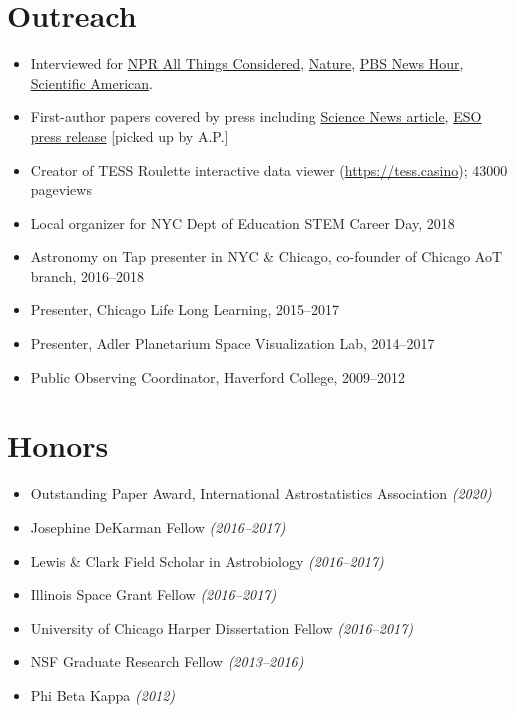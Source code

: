 \documentclass{clean_cv}
\begin{document}
\section{Outreach}
\begin{itemize}
    \item Interviewed for \href{https://www.npr.org/2018/10/03/653666274/scientists-find-what-could-be-a-history-making-moon}{NPR All Things Considered}, \href{https://www.nature.com/articles/d41586-018-04979-4}{Nature}, \href{https://www.pbs.org/newshour/science/these-stunning-maps-of-the-milky-way-pinpoint-more-than-1-billion-stars}{PBS News Hour}, \href{https://blogs.scientificamerican.com/observations/the-milky-way-revealed-as-never-before/}{Scientific American}.
    \item First-author papers covered by press including \href{https://www.sciencenews.org/article/sun-peculiar-makeup-compared-solar-twins}{Science News article}, \href{http://www.eso.org/public/usa/news/eso1529/}{ESO press release} [picked up by A.P.]
    \item Creator of TESS Roulette interactive data viewer (\href{https://tess.casino}{https://tess.casino}); 43000 pageviews
    \item Local organizer for NYC Dept of Education STEM Career Day, 2018
    \item Astronomy on Tap presenter in NYC \& Chicago, co-founder of Chicago AoT branch, 2016--2018
    \item Presenter, Chicago Life Long Learning, 2015--2017
    \item Presenter, Adler Planetarium Space Visualization Lab, 2014--2017
    \item Public Observing Coordinator, Haverford College, 2009--2012
\end{itemize}


\section{Honors}

\begin{itemize}
    \item Outstanding Paper Award, International Astrostatistics Association \textit{(2020)}
    \item Josephine DeKarman Fellow \textit{(2016--2017)}
    \item Lewis \& Clark Field Scholar in Astrobiology \textit{(2016--2017)}
    \item Illinois Space Grant Fellow \textit{(2016--2017)}
    \item University of Chicago Harper Dissertation Fellow \textit{(2016--2017)}
    \item NSF Graduate Research Fellow \textit{(2013--2016)}
    \item Phi Beta Kappa \textit{(2012)}
\end{itemize}
\end{document}
